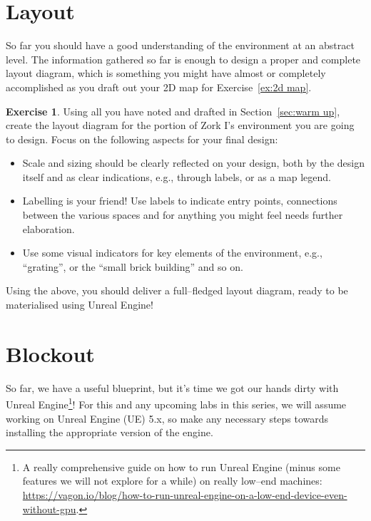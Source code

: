 \documentclass[a4paper]{tufte-handout}
\theoremstyle{definition}
\newtheorem{exercise}{Exercise}
\begin{document}
	\section{Layout}\label{sec:layout}
	So far you should have a good understanding of the environment at an abstract level. The information gathered so far is enough to design a proper and complete layout diagram, which is something you might have almost or completely accomplished as you draft out your 2D map for Exercise~\ref{ex:2d map}.
	
	\begin{exercise}\label{ex:layout}
		Using all you have noted and drafted in Section~\ref{sec:warm up}, create the layout diagram for the portion of Zork I's environment you are going to design. Focus on the following aspects for your final design:
		\begin{itemize}
			\item Scale and sizing should be clearly reflected on your design, both by the design itself and as clear indications, e.g., through labels, or as a map legend.
			\item Labelling is your friend! Use labels to indicate entry points, connections between the various spaces and for anything you might feel  needs further elaboration.
			\item Use some visual indicators for key elements of the environment, e.g., ``grating'', or the ``small brick building'' and so on.
		\end{itemize}
		Using the above, you should deliver a full--fledged layout diagram, ready to be materialised using Unreal Engine! 
	\end{exercise}
	\section{Blockout}\label{sec:block out}
	So far, we have a useful blueprint, but it's time we got our hands dirty with Unreal Engine\footnote{A really comprehensive guide on how to run Unreal Engine (minus some features we will not explore for a while) on really low--end machines: \href{https://vagon.io/blog/how-to-run-unreal-engine-on-a-low-end-device-even-without-gpu}{https://vagon.io/blog/how-to-run-unreal-engine-on-a-low-end-device-even-without-gpu}.}! For this and any upcoming labs in this series, we will assume working on Unreal Engine (UE) 5.x, so make any necessary steps towards installing the appropriate version of the engine.
	
\end{document}
